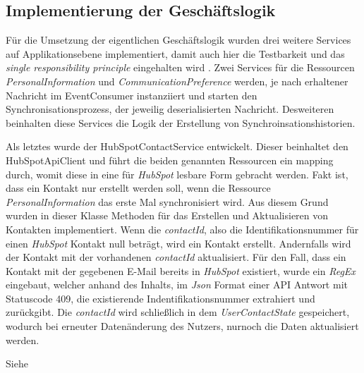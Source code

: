 \subsection{Implementierung der Geschäftslogik}
\label{sec:ImplementierungGeschaeftslogik}
Für die Umsetzung der eigentlichen Geschäftslogik wurden drei weitere Services auf Applikationsebene implementiert, damit auch hier die Testbarkeit
und das \textit{single responsibility principle} eingehalten wird \cite{CleanCodeDeveloperGrade}. Zwei Services für die Ressourcen \textit{PersonalInformation} und \textit{CommunicationPreference}
werden, je nach erhaltener Nachricht im EventConsumer instanziiert und starten den Synchronisationsprozess, der jeweilig deserialisierten Nachricht.
Desweiteren beinhalten diese Services die Logik der Erstellung von Synchroinsationshistorien.
\par\smallskip
Als letztes wurde der HubSpotContactService entwickelt. Dieser beinhaltet den HubSpotApiClient und führt die beiden genannten Ressourcen
ein mapping durch, womit diese in eine für \textit{HubSpot} lesbare Form gebracht werden. Fakt ist, dass ein Kontakt nur erstellt werden soll, wenn
die Ressource \textit{PersonalInformation} das erste Mal synchronisiert wird. Aus diesem Grund wurden in dieser Klasse Methoden für das Erstellen und Aktualisieren
von Kontakten implementiert. Wenn die \textit{contactId}, also die Identifikationsnummer für einen \textit{HubSpot} Kontakt null beträgt, wird ein Kontakt erstellt.
Andernfalls wird der Kontakt mit der vorhandenen \textit{contactId} aktualisiert. Für den Fall, dass ein Kontakt mit der gegebenen E-Mail bereits in \textit{HubSpot}
existiert, wurde ein \textit{\acs{RegEx}} eingebaut, welcher anhand des Inhalts, im \textit{\acs{Json}} Format einer API Antwort mit Statuscode 409, die existierende
Indentifikationsnummer extrahiert und zurückgibt. Die \textit{contactId} wird schließlich in dem \textit{UserContactState} gespeichert, wodurch bei erneuter Datenänderung
des Nutzers, nurnoch die Daten aktualisiert werden.
\par\smallskip
Siehe 
